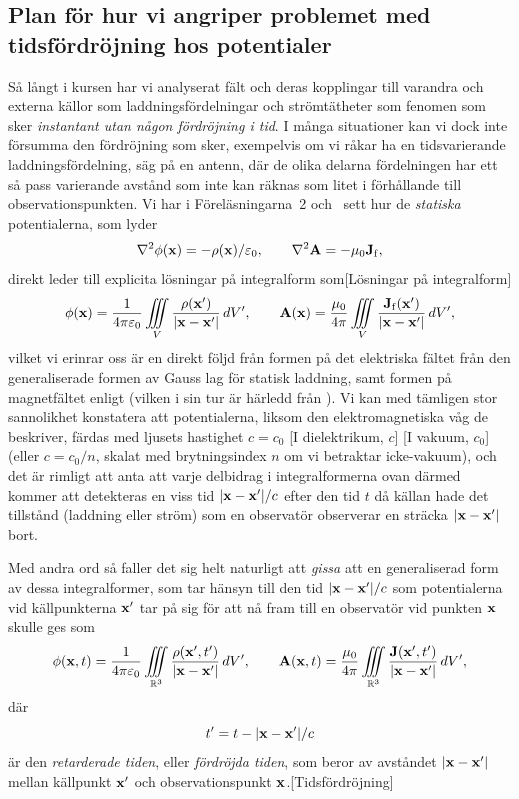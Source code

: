 \subsection{Plan f{\"o}r hur vi angriper problemet med tidsf{\"o}rdr{\"o}jning
  hos potentialer}
S{\aa} l{\aa}ngt i kursen har vi analyserat f{\"a}lt och deras kopplingar till
varandra och externa k{\"a}llor som laddningsf{\"o}rdelningar och
str{\"o}mt{\"a}theter som fenomen som sker {\it instantant utan n{\aa}gon
f{\"o}rdr{\"o}jning i tid}. I m{\aa}nga situationer kan vi dock inte
f{\"o}rsumma den f{\"o}rdr{\"o}jning som sker, exempelvis om vi r{\aa}kar ha
en tidsvarierande laddningsf{\"o}rdelning, s{\"a}g p{\aa} en antenn, d{\"a}r
de olika delarna f{\"o}rdelningen har ett s{\aa} pass varierande avst{\aa}nd
som inte kan r{\"a}knas som litet i f{\"o}rh{\aa}llande till
observa\-tions\-punkten.
Vi har i F{\"o}rel{\"a}sningarna~2 och~ sett hur de {\it statiska} potentialerna,
som lyder 
$$
  \nabla^2\phi({\bf x})=-\rho({\bf x})/\varepsilon_0,\qquad
  \nabla^2{\bf A}=-\mu_0{\bf J}_{\rm f},
$$
direkt leder till explicita l{\"o}sningar p{\aa} integralform som[L{\"o}sningar p{\aa} integralform]
$$
  \phi({\bf x})={{1}\over{4\pi\varepsilon_0}}\iiint_V
    {{\rho({\bf x}')}\over{|{\bf x}-{\bf x}'|}}\,dV',\qquad
  {\bf A}({\bf x})={{\mu_0}\over{4\pi}}\iiint_V
    {{{\bf J}_{\rm f}({\bf x}')}\over{|{\bf x}-{\bf x}'|}}\,dV',
$$
vilket vi erinrar oss {\"a}r en direkt f{\"o}ljd fr{\aa}n formen p{\aa} det
elektriska f{\"a}ltet fr{\aa}n den generaliserade formen av Gauss lag f{\"o}r
statisk laddning, samt formen p{\aa} magnetf{\"a}ltet enligt 
(vilken i sin tur {\"a}r h{\"a}rledd fr{\aa}n ).
Vi kan med t{\"a}mligen stor sannolikhet konstatera att potentialerna, liksom den
elektromagnetiska v{\aa}g de beskriver, f{\"a}rdas med ljusets hastighet $c=c_0$
[I dielektrikum, $c$] [I vakuum, $c_0$]
(eller $c=c_0/n$, skalat med brytningsindex $n$  om vi
betraktar icke-vakuum), och det {\"a}r rimligt att anta att varje delbidrag i
integralformerna ovan d{\"a}rmed kommer att detekteras en viss tid
$|{\bf x}-{\bf x}'|/c$ efter den tid $t$ d{\aa} k{\"a}llan hade det
tillst{\aa}nd (laddning eller str{\"o}m) som en observat{\"o}r observerar
en str{\"a}cka $|{\bf x}-{\bf x}'|$ bort.

Med andra ord s{\aa} faller det sig helt naturligt att {\it gissa} att en
generaliserad form av dessa integralformer, som tar h{\"a}nsyn till den tid
$|{\bf x}-{\bf x}'|/c$ som potentialerna vid k{\"a}llpunkterna ${\bf x}'$ tar
p{\aa} sig f{\"o}r att n{\aa} fram till en observat{\"o}r vid punkten ${\bf x}$
skulle ges som
$$
  \phi({\bf x},t)={{1}\over{4\pi\varepsilon_0}}\iiint_{{\Bbb R}^3}
    {{\rho({\bf x}',t')}\over{|{\bf x}-{\bf x}'|}}\,dV',\qquad
  {\bf A}({\bf x},t)={{\mu_0}\over{4\pi}}\iiint_{{\Bbb R}^3}
    {{{\bf J}({\bf x}',t')}\over{|{\bf x}-{\bf x}'|}}\,dV',
$$
d{\"a}r
$$
  t' = t - |{\bf x}-{\bf x}'|/c
$$
{\"a}r den {\it retarderade tiden}, eller {\it f{\"o}rdr{\"o}jda tiden}, som
beror av avst{\aa}ndet $|{\bf x}-{\bf x}'|$ mellan k{\"a}llpunkt ${\bf x}'$ och
observationspunkt ${\bf x}$.[Tidsf{\"o}rdr{\"o}jning]


